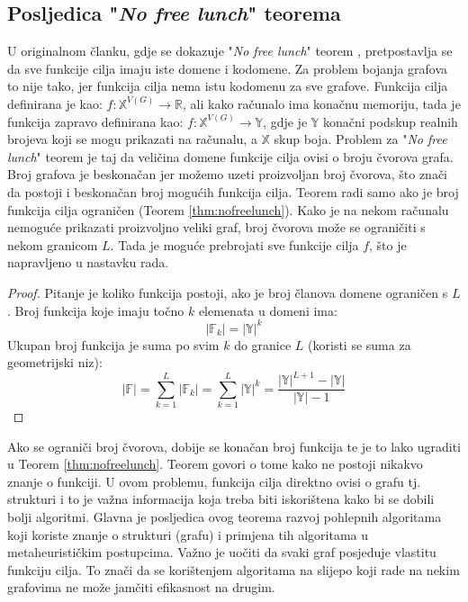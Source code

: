 \documentclass[times, utf8, diplomski, numeric]{fer}
\begin{document}
\subsection{Posljedica "\emph{No free lunch}" teorema}

U originalnom članku, gdje se dokazuje "\emph{No free lunch}" teorem \cite{lit15}, pretpostavlja se da sve funkcije cilja imaju iste domene i kodomene. Za problem bojanja grafova to nije tako, jer funkcija cilja nema istu kodomenu za sve grafove. Funkcija cilja definirana je kao: $f:\mathbb{X}^{V(G)} \rightarrow \mathbb{R}$, ali kako računalo ima konačnu memoriju, tada je funkcija zapravo definirana kao: $f:\mathbb{X}^{V(G)} \rightarrow \mathbb{Y}$, gdje je $\mathbb{Y}$ konačni podskup realnih brojeva koji se mogu prikazati na računalu, a $\mathbb{X}$ skup boja. Problem za "\emph{No free lunch}" teorem je taj da veličina domene funkcije cilja ovisi o broju čvorova grafa. Broj grafova je beskonačan jer možemo uzeti proizvoljan broj čvorova, što znači da postoji i beskonačan broj mogućih funkcija cilja. Teorem radi samo ako je broj funkcija cilja ograničen (Teorem \ref{thm:nofreelunch}). Kako je na nekom računalu nemoguće prikazati proizvoljno veliki graf, broj čvorova može se ograničiti s nekom granicom $L$. Tada je moguće prebrojati sve funkcije cilja $f$, što je napravljeno u nastavku rada.

\begin{proof}
Pitanje je koliko funkcija postoji, ako je broj članova domene ograničen s $L$.
Broj funkcija koje imaju točno $k$ elemenata u domeni ima:
	\begin{equation}
		|\mathbb{F}_k| = |\mathbb{Y}|^k
	\end{equation}
Ukupan broj funkcija je suma po svim $k$ do granice $L$ (koristi se suma za geometrijski niz):
	\begin{equation}
		|\mathbb{F}| = \sum_{k=1}^{L}|\mathbb{F}_k| = \sum_{k=1}^{L} |\mathbb{Y}|^k = \frac{|\mathbb{Y}|^{L+1}-|\mathbb{Y}|}{|\mathbb{Y}|-1}
	\end{equation}
\end{proof} 

Ako se ograniči broj čvorova, dobije se konačan broj funkcija te je to lako ugraditi u Teorem \ref{thm:nofreelunch}. Teorem govori o tome kako ne postoji nikakvo znanje o funkciji. U ovom problemu, funkcija cilja direktno ovisi o grafu tj. strukturi i to je važna informacija koja treba biti iskorištena kako bi se dobili bolji algoritmi. Glavna je posljedica ovog teorema razvoj pohlepnih algoritama koji koriste znanje o strukturi (grafu) i primjena tih algoritama u metaheurističkim postupcima. 
Važno je uočiti da svaki graf posjeduje vlastitu funkciju cilja. To znači da se korištenjem algoritama na slijepo koji rade na nekim grafovima ne može jamčiti efikasnost na drugim.
\end{document}
